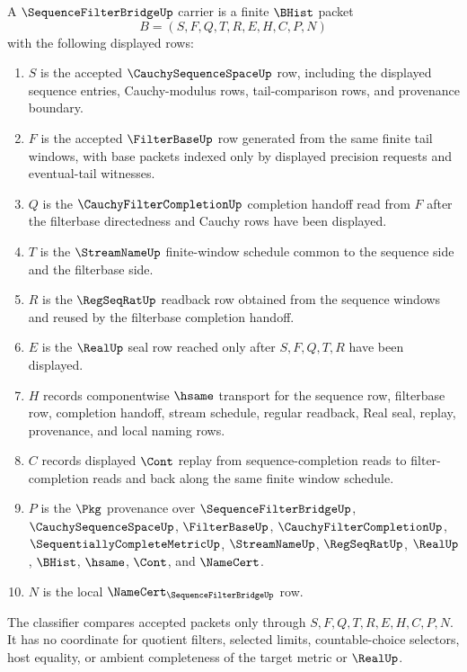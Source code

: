 \begin{definition}\label{def:sequence-filter-bridge-carrier}
A $\SequenceFilterBridgeUp$ carrier is a finite $\BHist$ packet
$$
B=(S,F,Q,T,R,E,H,C,P,N)
$$
with the following displayed rows:
\begin{enumerate}
\item $S$ is the accepted $\CauchySequenceSpaceUp$ row, including the displayed sequence entries, Cauchy-modulus rows, tail-comparison rows, and provenance boundary.
\item $F$ is the accepted $\FilterBaseUp$ row generated from the same finite tail windows, with base packets indexed only by displayed precision requests and eventual-tail witnesses.
\item $Q$ is the $\CauchyFilterCompletionUp$ completion handoff read from $F$ after the filterbase directedness and Cauchy rows have been displayed.
\item $T$ is the $\StreamNameUp$ finite-window schedule common to the sequence side and the filterbase side.
\item $R$ is the $\RegSeqRatUp$ readback row obtained from the sequence windows and reused by the filterbase completion handoff.
\item $E$ is the $\RealUp$ seal row reached only after $S,F,Q,T,R$ have been displayed.
\item $H$ records componentwise $\hsame$ transport for the sequence row, filterbase row, completion handoff, stream schedule, regular readback, Real seal, replay, provenance, and local naming rows.
\item $C$ records displayed $\Cont$ replay from sequence-completion reads to filter-completion reads and back along the same finite window schedule.
\item $P$ is the $\Pkg$ provenance over $\SequenceFilterBridgeUp$, $\CauchySequenceSpaceUp$, $\FilterBaseUp$, $\CauchyFilterCompletionUp$, $\SequentiallyCompleteMetricUp$, $\StreamNameUp$, $\RegSeqRatUp$, $\RealUp$, $\BHist$, $\hsame$, $\Cont$, and $\NameCert$.
\item $N$ is the local $\NameCert_{\SequenceFilterBridgeUp}$ row.
\end{enumerate}
The classifier compares accepted packets only through $S,F,Q,T,R,E,H,C,P,N$. It has no coordinate for quotient filters, selected limits, countable-choice selectors, host equality, or ambient completeness of the target metric or $\RealUp$.
\end{definition}


